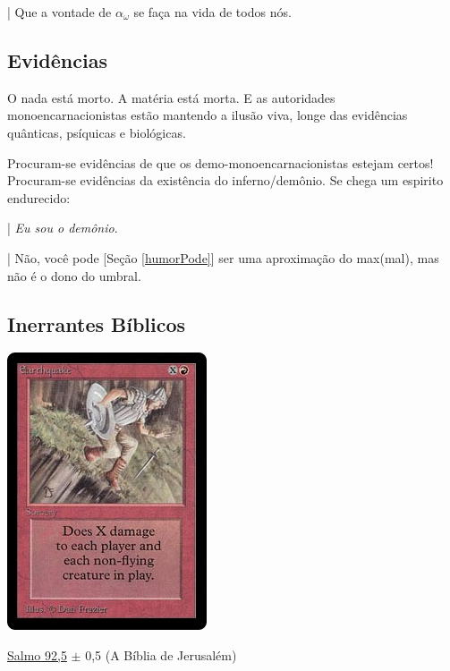 \documentclass[12pt,a4paper]{article}
\begin{document}
			| Que a vontade de $ \alpha_\omega $ se fa\c{c}a na vida de todos n\'os.

		\subsection{Evid\^encias}
			\begin{flushright}
			\end{flushright}

			O nada est\'a morto. A mat\'eria\cite{materia} est\'a morta. E as autoridades monoencarnacionistas est\~ao mantendo a ilus\~ao\cite{ilusao} viva, longe das evid\^encias qu\^anticas, ps\'iquicas e biol\'ogicas.

			Procuram-se evid\^encias de que os demo-monoencarnacionistas estejam certos! Procuram-se evid\^encias da exist\^encia do inferno/dem\^onio. Se chega um espirito endurecido:

			| \emph{Eu sou o dem\^onio}.

			| N\~ao, voc\^e pode [Se\c{c}\~ao \ref{humorPode}] ser uma aproxima\c{c}\~ao do max(mal), mas n\~ao \'e o dono do umbral.

		\subsection{Inerrantes B\'iblicos}
			\begin{flushright}
			\end{flushright}

			\begin{center}
			\includegraphics{terremoto}
			\end{center}

			\underline{Salmo 92,5} $\pm$ 0,5 (A B\'iblia de Jerusal\'em)
\end{document}
